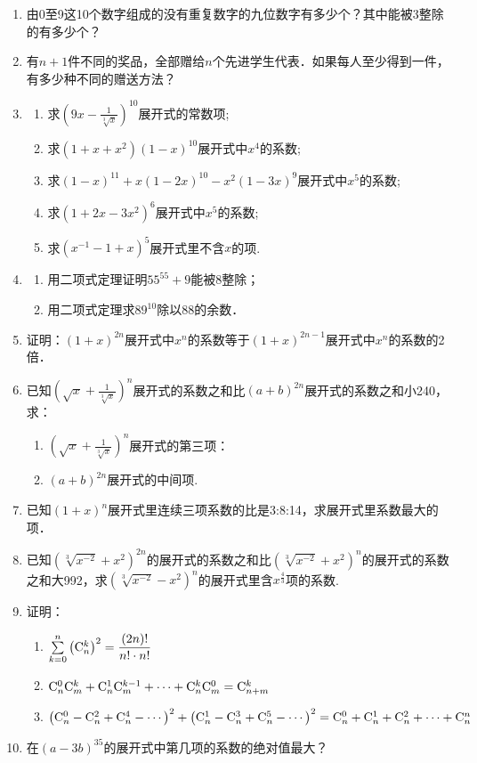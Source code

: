 \begin{enumerate}
\item 由0至9这10个数字组成的没有重复数字的九位数字有多少个？其中能被3整除的有多少个？
\item 有$n+1$件不同的奖品，全部赠给$n$个先进学生代表．如果每人至少得到一件，有多少种不同的赠送方法？
\item \begin{enumerate}[(1)]
    \item 求$\left(9x-\frac{1}{\sqrt[3]{x}}\right)^{10}$展开式的常数项;
    \item 求$(1+x+x^2)(1-x)^{10}$展开式中$x^4$的系数;
    \item 求$(1-x)^{11}+x(1-2x)^{10}-x^2(1-3x)^9$展开式中$x^5$的系数;
    \item 求$(1+2x-3x^2)^6$展开式中$x^5$的系数;
    \item 求$(x^{-1}-1+x)^5$展开式里不含$x$的项.
\end{enumerate}
\item \begin{enumerate}[(1)]
    \item 用二项式定理证明$55^{55}+9$能被8整除；
    \item 用二项式定理求$89^{10}$除以88的余数．
\end{enumerate}

\item 证明：$(1+x)^{2n}$展开式中$x^n$的系数等于$(1+x)^{2n-1}$展开式中$x^n$的系数的2倍．
\item 已知$\left(\sqrt{x}+\frac{1}{\sqrt[3]{x}}\right)^n$展开式的系数之和比$(a+b)^{2n}$展开式的系数之和小240，求：
\begin{enumerate}[(1)]
    \item $\left(\sqrt{x}+\frac{1}{\sqrt[3]{x}}\right)^n$展开式的第三项：
    \item $(a+b)^{2n}$展开式的中间项.
\end{enumerate}

\item 已知$(1+x)^n$展开式里连续三项系数的比是3:8:14，求展开式里系数最大的项．
\item 已知$\left(\sqrt[3]{x^{-2}}+x^2\right)^{2n}$的展开式的系数之和比$\left(\sqrt[3]{x^{-2}}+x^2\right)^{n}$的展开式的系数之和大992，求$\left(\sqrt[3]{x^{-2}}-x^2\right)^{n}$的展开式里含$x^{\tfrac{4}{3}}$项的系数.

\item 证明：
\begin{enumerate}[(1)]
    \item $\sum\limits^n_{k=0}\left({\rm C}^{k}_{n}\right)^2=\dfrac{(2n)!}{n!\cdot n!}$
    \item ${\rm C}^{0}_{n}{\rm C}^{k}_{m}+{\rm C}^{1}_{n}{\rm C}^{k-1}_{m}+\cdots+{\rm C}^{k}_{n}{\rm C}^{0}_{m}={\rm C}^{k}_{n+m}$
    \item $\left({\rm C}^{0}_{n}-{\rm C}^{2}_{n}+{\rm C}^{4}_{n}-\cdots\right)^2+ \left({\rm C}^{1}_{n}-{\rm C}^{3}_{n}+{\rm C}^{5}_{n}-\cdots\right)^2={\rm C}^{0}_{n}+{\rm C}^{1}_{n}+{\rm C}^{2}_{n}+\cdots+{\rm C}^{n}_{n}$
\end{enumerate}

\item 在$(a-3b)^{35}$的展开式中第几项的系数的绝对值最大？
\end{enumerate}

